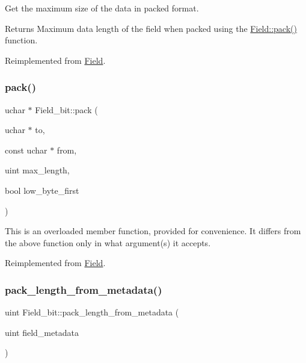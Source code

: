 Get the maximum size of the data in packed format.

\begin{DoxyReturn}{Returns}
Maximum data length of the field when packed using the \mbox{\hyperlink{classField_a9eaff8d3425ef0e1da69b32cbd8f2879}{Field\+::pack()}} function. 
\end{DoxyReturn}


Reimplemented from \mbox{\hyperlink{classField_ab628f9b9a6253a5b675c97095bf01aac}{Field}}.

\mbox{\label{classField__bit_a330cb15674837be6c0487ffcbbdc9ba4}} 
\subsubsection{\texorpdfstring{pack()}{pack()}}
{\footnotesize\ttfamily uchar $\ast$ Field\+\_\+bit\+::pack (\begin{DoxyParamCaption}\item[{uchar $\ast$}]{to,  }\item[{const uchar $\ast$}]{from,  }\item[{uint}]{max\+\_\+length,  }\item[{bool}]{low\+\_\+byte\+\_\+first }\end{DoxyParamCaption})\hspace{0.3cm}{\ttfamily [virtual]}}

This is an overloaded member function, provided for convenience. It differs from the above function only in what argument(s) it accepts.

Reimplemented from \mbox{\hyperlink{classField_a9eaff8d3425ef0e1da69b32cbd8f2879}{Field}}.

\mbox{\label{classField__bit_abb93169009e3b74b3b94a2ae33c9b802}} 
\subsubsection{\texorpdfstring{pack\+\_\+length\+\_\+from\+\_\+metadata()}{pack\_length\_from\_metadata()}}
{\footnotesize\ttfamily uint Field\+\_\+bit\+::pack\+\_\+length\+\_\+from\+\_\+metadata (\begin{DoxyParamCaption}\item[{uint}]{field\+\_\+metadata }\end{DoxyParamCaption})\hspace{0.3cm}{\ttfamily [virtual]}}


